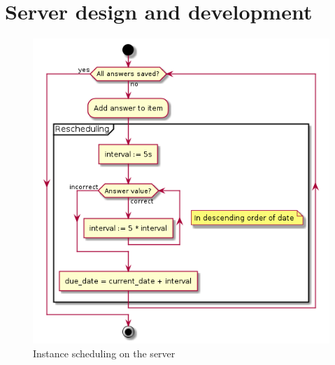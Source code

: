 \chapter{Server design and development}
\label{ch:server}

\begin{figure}[h!]
\centering
\includegraphics[width=\textwidth]{img/learningserver.png}
\caption{Instance scheduling on the server}
\label{fig:learningserver}
\end{figure}
